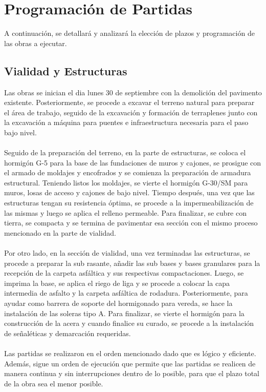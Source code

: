 \section{Programación de Partidas}

A continuación, se detallará y analizará la elección de plazos y programación de las obras a ejecutar.

\subsection{Vialidad y Estructuras}

Las obras se inician el dia lunes 30 de septiembre con la demolición del
pavimento existente. Posteriormente, se procede a excavar el terreno natural
para preparar el área de trabajo, seguido de la excavación y formación de
terraplenes junto con la excavación a máquina para puentes e infraestructura
necesaria para el paso bajo nivel. 
\\\\
Seguido de la preparación del terreno, en la parte de estructuras, se coloca el hormigón G-5 
para la base de las fundaciones de muros y cajones, se prosigue con el armado de moldajes y 
encofrados y se comienza la preparación de armadura estructural. Teniendo listos los moldajes, 
se vierte el hormigón G-30/SM para muros, losas de acceso y cajones de bajo nivel. Tiempo después, 
una vez que las estructuras tengan su resistencia óptima, se procede a la impermeabilización de las 
mismas y luego se aplica el relleno permeable. Para finalizar, se cubre con tierra, se compacta 
y se termina de pavimentar esa sección con el mismo proceso mencionado en la parte de vialidad.
\\\\
Por otro lado, en la sección de vialidad, una vez terminadas las estructuras, se procede
a preparar la sub rasante, añadir las sub bases y bases granulares para la recepción de 
la carpeta asfáltica y sus respectivas compactaciones. Luego, se imprima la base, se
aplica el riego de liga y se procede a colocar la capa intermedia de asfalto y 
la carpeta asfáltica de rodadura. Posteriormente, para ayudar como barrera de soporte del 
hormigonado para vereda, se hace la instalación de las soleras tipo A. Para finalizar, se vierte el
hormigón para la construcción de la acera y cuando finalice su curado, se procede a la 
instalación de señaléticas y demarcación requeridas.
\\\\
Las partidas se realizaron en el orden mencionado dado que es lógico y eficiente. Además, sigue un
orden de ejecución que permite que las partidas se realicen de manera continua y sin interrupciones
dentro de lo posible, para que el plazo total de la obra sea el menor posible.

